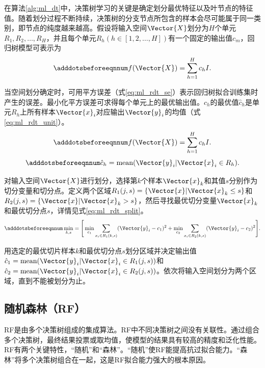 在算法\ref{alg:ml_dt}中，决策树学习的关键是确定划分最优特征以及叶节点的特征值。随着划分过程不断持续，决策树的分支节点所包含的样本会尽可能属于同一类别，即节点的纯度越来越高。假设将输入空间$\Vector{X}$划分为$H$个单元$R_1,R_2,\ldots,R_H$，并且每个单元$R_h (h\in[1,2,\ldots,H])$有一个固定的输出值$c_m$，回归树模型可表示为
\begin{equation}\adddotsbeforeeqnnum
  \label{eq:ml_rdt}
  f(\Vector{X})=\sum_{h=1}^{H}c_hI.
\end{equation}

当空间划分确定时，可用平方误差（式\ref{eq:ml_rdt_se}）表示回归树拟合训练集时产生的误差。最小化平方误差可求得每个单元上的最优输出值。$c_h$的最优值$\hat{c}_h$是单元$R_h$上所有样本$\Vector{x}_i$对应输出$\Vector{y}_i$的均值（式\ref{eq:ml_rdt_unit}）。
\begin{equation}\adddotsbeforeeqnnum
  \label{eq:ml_rdt_se}
  f(\Vector{X})=\sum_{h=1}^{H}c_hI.
\end{equation}
\begin{equation}\adddotsbeforeeqnnum
  \label{eq:ml_rdt_unit}
  \hat{c}_h=\text{mean}(\Vector{y}_i|\Vector{x}_i\in R_h).
\end{equation}

对输入空间$\Vector{X}$进行划分，选择第$k$个样本$\Vector{x}_k$和其值$s$分别作为切分变量和切分点。定义两个区域$R_1(j,s)=\{\Vector{x}|\Vector{x}_k\le s\}$和$R_2(j,s)=\{\Vector{x}|\Vector{x}_k>s\}$，然后寻找最优切分变量$\Vector{x}_k$和最优切分点$s$，详情见式\ref{eq:ml_rdt_split}。
\begin{equation}\adddotsbeforeeqnnum
  \label{eq:ml_rdt_split}
  \min_{k,s}=\Bigg[\min_{c_1}^{}\sum_{x_i\in R_1(k,s)}(\Vector{y}_i-c_1)^2+\min_{c_2}^{}\sum_{x_i\in R_2(k,s)}(\Vector{y}_i-c_2)^2\Bigg].
\end{equation}

用选定的最优切片样本$k$和最优切分点$s$划分区域并决定输出值$\hat{c}_1=\text{mean}(\Vector{y}_i|\Vector{x}_i\in R_1(j,s))$和$\hat{c}_2=\text{mean}(\Vector{y}_i|\Vector{x}_i\in R_2(j,s))$。依次将输入空间划分为两个区域，直到不能被划分为止。

\subsection{随机森林（RF）}\label{sec:ml_rf}

RF是由多个决策树组成的集成算法。RF中不同决策树之间没有关联性。通过组合多个决策树，最终结果投票或取均值，使模型的结果具有较高的精度和泛化性能。RF有两个关键特性，“随机”和“森林”。“随机”使RF能提高抗过拟合能力。“森林”将多个决策树组合在一起，这是RF拟合能力强大的根本原因。

